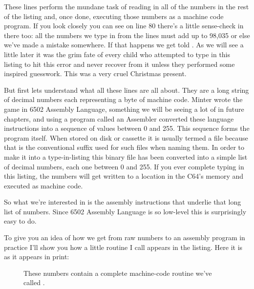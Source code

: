 These lines perform the mundane task of reading in all of the numbers in the
rest of the listing and, once done, executing those numbers as a machine code
program. If you look closely you can see on line 80 there's a little sense-check in there too: all the numbers
we type in from the  lines must add up to 98,035 or else we've made a mistake somewhere. If that happens
we get told . As we will see a little later it was the grim fate of every child who
attempted to type in this listing to hit this error and never recover from it unless they performed some
inspired guesswork. This was a very cruel Christmas present.

But first lets understand what all these  lines are all about. They are a long string of decimal
numbers each representing a byte of machine code. Minter wrote the game in 6502 Assembly Language, something
we will be seeing a lot of in future chapters, and using a program called an Assembler converted these
language instructions into a sequence of values between 0 and 255. This sequence forms the program itself.
When stored on disk or cassette it is usually termed a  file because that is the conventional
suffix used for such files when naming them. In order to make it into a type-in-listing this binary file
has been converted into a simple list of decimal numbers, each one between 0 and 255. If you ever complete
typing in this listing, the numbers will get written to a location in the C64's memory and executed as 
machine code.

So what we're interested in is the assembly instructions that underlie that long list of numbers. Since 
6502 Assembly Language is so low-level this is surprisingly easy to do.


To give you an idea of how we get from raw numbers to an assembly program in practice I'll show you how
a little routine I call  appears in the listing. Here it is as it appears in print:

\begin{figure}[H]
    \centering
    \begin{adjustbox}{width=7cm,center}
    \end{adjustbox}
  \caption{These numbers contain a complete machine-code routine we've called .}
\end{figure}

